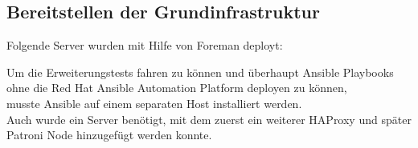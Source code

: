 
\begin{flushleft}
    \subsection{Bereitstellen der Grundinfrastruktur}
    Folgende Server wurden mit Hilfe von \Gls{Foreman} deployt:
    
\end{flushleft}
\begin{flushleft}
    Um die Erweiterungstests fahren zu können und überhaupt \Gls{Ansible} Playbooks ohne die \Gls{Red Hat Ansible Automation Platform} deployen zu können,\\
    musste \Gls{Ansible} auf einem separaten Host installiert werden.\\
    Auch wurde ein Server benötigt, mit dem zuerst ein weiterer \Gls{HAProxy} und später Patroni Node hinzugefügt werden konnte.
    
\end{flushleft}
